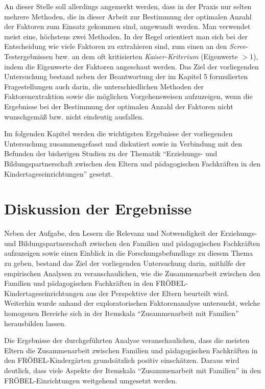 \documentclass[12pt,a4paper]{article}
\begin{document}
An dieser Stelle soll allerdings angemerkt werden, dass in der Praxis nur selten mehrere Methoden, die in dieser Arbeit zur Bestimmung der optimalen Anzahl der Faktoren zum Einsatz gekommen sind, angewandt werden. Man verwendet meist eine, höchstens zwei Methoden. In der Regel orientiert man sich bei der Entscheidung wie viele Faktoren zu extrahieren sind, zum einen an den \textit{Scree}-Testergebnissen bzw. an dem oft kritisierten \textit{Kaiser-Kriterium} (Eigenwerte $>1$), indem die Eigenwerte der Faktoren angeschaut werden. Das Ziel der vorliegenden Untersuchung bestand neben der Beantwortung der im Kapitel 5 formulierten Fragestellungen auch darin, die unterschiedlichen Methoden der Faktorenextraktion sowie die möglichen Vorgehensweisen aufzuzeigen, wenn die Ergebnisse bei der Bestimmung der optimalen Anzahl der Faktoren nicht wunschgemäß bzw. nicht eindeutig ausfallen.

	Im folgenden Kapitel werden die wichtigsten Ergebnisse der vorliegenden Untersuchung zusammengefasst und diskutiert sowie in Verbindung mit den Befunden der bisherigen Studien zu der Thematik "`Erziehungs- und Bildungspartnerschaft zwischen den Eltern und pädagogischen Fachkräften in den Kindertageseinrichtungen"' gesetzt.

\section{Diskussion der Ergebnisse}
Neben der Aufgabe, den Lesern die Relevanz und Notwendigkeit der Erziehungs- und Bildungspartnerschaft zwischen den Familien und pädagogischen Fachkräften aufzuzeigen sowie einen Einblick in die Forschungsbefundlage zu diesem Thema zu geben, bestand das Ziel der vorliegenden Untersuchung darin, mithilfe der empirischen Analysen zu veranschaulichen, wie die Zusammenarbeit zwischen den Familien und pädagogischen Fachkräften in den FRÖBEL-Kinder\-tages\-ein\-rich\-tun\-gen aus der Perspektive der Eltern beurteilt wird.  Weiterhin wurde anhand der exploratorischen Faktorenanalyse untersucht, welche homogenen Bereiche sich in der Itemskala "`Zusammenarbeit mit Familien"' herausbilden  lassen.

	Die Ergebnisse der durchgeführten Analyse veranschaulichen, dass die meisten Eltern die Zusammenarbeit zwischen Familien und pädagogischen Fa\-chkräf\-ten in den FRÖBEL-Kindergärten grundsätzlich positiv einschätzen. Daraus wird deutlich, dass viele Aspekte der Itemskala "`Zusammenarbeit mit Familien"' in den FRÖBEL-Einrichtungen weitgehend umgesetzt werden.
	
\end{document}
